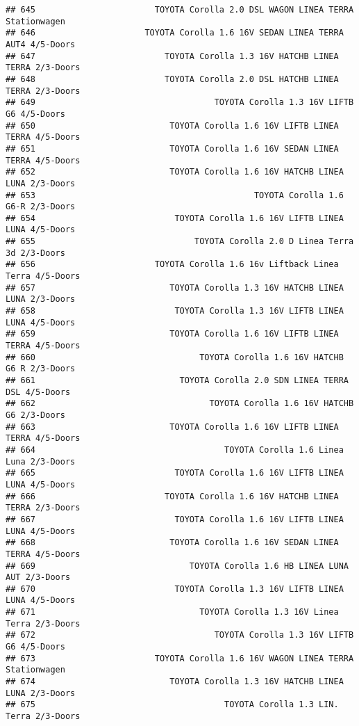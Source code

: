 \documentclass[]{article}
\begin{document}
\begin{verbatim}
## 645                        TOYOTA Corolla 2.0 DSL WAGON LINEA TERRA Stationwagen
## 646                      TOYOTA Corolla 1.6 16V SEDAN LINEA TERRA AUT4 4/5-Doors
## 647                          TOYOTA Corolla 1.3 16V HATCHB LINEA TERRA 2/3-Doors
## 648                          TOYOTA Corolla 2.0 DSL HATCHB LINEA TERRA 2/3-Doors
## 649                                    TOYOTA Corolla 1.3 16V LIFTB G6 4/5-Doors
## 650                           TOYOTA Corolla 1.6 16V LIFTB LINEA TERRA 4/5-Doors
## 651                           TOYOTA Corolla 1.6 16V SEDAN LINEA TERRA 4/5-Doors
## 652                           TOYOTA Corolla 1.6 16V HATCHB LINEA LUNA 2/3-Doors
## 653                                            TOYOTA Corolla 1.6 G6-R 2/3-Doors
## 654                            TOYOTA Corolla 1.6 16V LIFTB LINEA LUNA 4/5-Doors
## 655                                TOYOTA Corolla 2.0 D Linea Terra 3d 2/3-Doors
## 656                        TOYOTA Corolla 1.6 16v Liftback Linea Terra 4/5-Doors
## 657                           TOYOTA Corolla 1.3 16V HATCHB LINEA LUNA 2/3-Doors
## 658                            TOYOTA Corolla 1.3 16V LIFTB LINEA LUNA 4/5-Doors
## 659                           TOYOTA Corolla 1.6 16V LIFTB LINEA TERRA 4/5-Doors
## 660                                 TOYOTA Corolla 1.6 16V HATCHB G6 R 2/3-Doors
## 661                             TOYOTA Corolla 2.0 SDN LINEA TERRA DSL 4/5-Doors
## 662                                   TOYOTA Corolla 1.6 16V HATCHB G6 2/3-Doors
## 663                           TOYOTA Corolla 1.6 16V LIFTB LINEA TERRA 4/5-Doors
## 664                                      TOYOTA Corolla 1.6 Linea Luna 2/3-Doors
## 665                            TOYOTA Corolla 1.6 16V LIFTB LINEA LUNA 4/5-Doors
## 666                          TOYOTA Corolla 1.6 16V HATCHB LINEA TERRA 2/3-Doors
## 667                            TOYOTA Corolla 1.6 16V LIFTB LINEA LUNA 4/5-Doors
## 668                           TOYOTA Corolla 1.6 16V SEDAN LINEA TERRA 4/5-Doors
## 669                               TOYOTA Corolla 1.6 HB LINEA LUNA AUT 2/3-Doors
## 670                            TOYOTA Corolla 1.3 16V LIFTB LINEA LUNA 4/5-Doors
## 671                                 TOYOTA Corolla 1.3 16V Linea Terra 2/3-Doors
## 672                                    TOYOTA Corolla 1.3 16V LIFTB G6 4/5-Doors
## 673                        TOYOTA Corolla 1.6 16V WAGON LINEA TERRA Stationwagen
## 674                           TOYOTA Corolla 1.3 16V HATCHB LINEA LUNA 2/3-Doors
## 675                                      TOYOTA Corolla 1.3 LIN. Terra 2/3-Doors

\end{verbatim}
\end{document}
